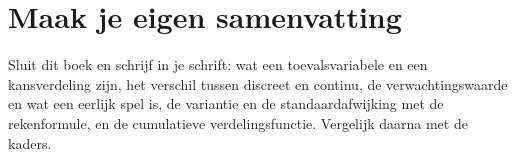 
\begin{oefeningen}





\end{oefeningen}


\ifzelfstudie
\section*{Maak je eigen samenvatting}
Sluit dit boek en schrijf in je schrift: wat een toevalsvariabele en een kansverdeling zijn, het verschil tussen discreet en continu, de verwachtingswaarde en wat een eerlijk spel is, de variantie en de standaardafwijking met de rekenformule, en de cumulatieve verdelingsfunctie. Vergelijk daarna met de kaders.
\fi
